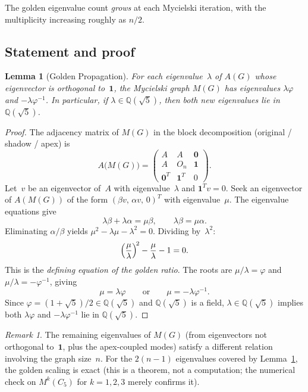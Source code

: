 \documentclass[11pt,a4paper]{amsart}
\theoremstyle{plain}
\newtheorem{lemma}[theorem]{Lemma}
\theoremstyle{definition}
\theoremstyle{remark}
\newtheorem{remark}[theorem]{Remark}
\newcommand{\Q}{\mathbb{Q}}
\newcommand{\vp}{\varphi}
\begin{document}
The golden eigenvalue count \emph{grows} at each Mycielski iteration, with the
multiplicity increasing roughly as $n/2$.

\subsection{Statement and proof}

\begin{lemma}[Golden Propagation]\label{lem:golden-propagation}
For each eigenvalue~$\lambda$ of $A(G)$ whose eigenvector is orthogonal
to~$\mathbf{1}$, the Mycielski graph $M(G)$ has eigenvalues $\lambda\vp$ and
$-\lambda\vp^{-1}$.  In particular, if $\lambda \in \Q(\sqrt{5})$, then both
new eigenvalues lie in $\Q(\sqrt{5})$.
\end{lemma}

\begin{proof}
The adjacency matrix of $M(G)$ in the block decomposition (original / shadow /
apex) is
\[
  A\bigl(M(G)\bigr)
  = \begin{pmatrix}
      A       & A         & \mathbf{0} \\
      A       & O_n       & \mathbf{1} \\
      \mathbf{0}^T & \mathbf{1}^T & 0
    \end{pmatrix}.
\]
Let~$v$ be an eigenvector of~$A$ with eigenvalue~$\lambda$ and
$\mathbf{1}^T v = 0$.  Seek an eigenvector of $A(M(G))$ of the form
$(\beta v,\,\alpha v,\,0)^T$ with eigenvalue~$\mu$.  The eigenvalue equations
give
\[
  \lambda\beta + \lambda\alpha = \mu\beta,
  \qquad
  \lambda\beta = \mu\alpha.
\]
Eliminating $\alpha/\beta$ yields $\mu^2 - \lambda\mu - \lambda^2 = 0$.
Dividing by~$\lambda^2$:
\begin{equation}\label{eq:golden-char}
  \Bigl(\frac{\mu}{\lambda}\Bigr)^{\!2}
  - \frac{\mu}{\lambda} - 1 = 0.
\end{equation}
This is the \emph{defining equation of the golden ratio}.  The roots are
$\mu/\lambda = \vp$ and $\mu/\lambda = -\vp^{-1}$, giving
\[
  \mu = \lambda\vp
  \qquad\text{or}\qquad
  \mu = -\lambda\vp^{-1}.
\]
Since $\vp = (1+\sqrt{5})/2 \in \Q(\sqrt{5})$ and $\Q(\sqrt{5})$ is a field,
$\lambda\in\Q(\sqrt{5})$ implies both $\lambda\vp$ and $-\lambda\vp^{-1}$ lie
in $\Q(\sqrt{5})$.
\end{proof}

\begin{remark}\label{rem:remaining-eigs}
The remaining eigenvalues of $M(G)$ (from eigenvectors not orthogonal
to~$\mathbf{1}$, plus the apex-coupled modes) satisfy a different relation
involving the graph size~$n$.  For the $2(n-1)$ eigenvalues covered by
Lemma~\ref{lem:golden-propagation}, the golden scaling is exact (this is a theorem,
not a computation; the numerical check on $M^k(C_5)$ for $k = 1,2,3$ merely
confirms it).
\end{remark}
\end{document}
